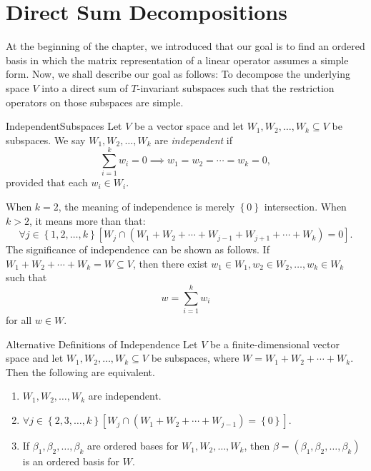 \documentclass[linearalgebraII]{subfiles}
\begin{document}
    \section{Direct Sum Decompositions}

    \begin{remark}
        At the beginning of the chapter, we introduced that our goal is to find an ordered basis in which the matrix representation of a linear operator assumes a simple form. Now, we shall describe our goal as follows: To decompose the underlying space $V$ into a direct sum of $T$-invariant subspaces such that the restriction operators on those subspaces are simple.
    \end{remark}
    
    \begin{definition}{Independent}{Subspaces}
        Let $V$ be a vector space and let $W_1, W_2, \ldots, W_k\subseteq V$ be subspaces. We say $W_1, W_2, \ldots, W_k$ are \emph{independent} if
        \begin{equation*}
            \sum^{k}_{i=1} w_i = 0\implies w_1=w_2=\cdots=w_k=0,
        \end{equation*}
        provided that each $w_i\in W_i$.
    \end{definition}

    \begin{remark}
        When $k=2$, the meaning of independence is merely $\left\lbrace 0 \right\rbrace$ intersection. When $k>2$, it means more than that:
        \begin{equation*}
            \forall j\in \left\lbrace 1, 2, \ldots, k \right\rbrace \left[ W_j\cap \left( W_1+W_2+\cdots+W_{j-1}+W_{j+1}+\cdots+W_k \right) = 0 \right].
        \end{equation*}
        The significance of independence can be shown as follows. If $W_1+W_2+\cdots+W_k=W\subseteq V$, then there exist $w_1\in W_1, w_2\in W_2,\ldots,w_k\in W_k$ such that
        \begin{equation*}
            w = \sum^{k}_{i=1} w_i
        \end{equation*}
        for all $w\in W$.
    \end{remark}

    \begin{prop}{Alternative Definitions of Independence}
        Let $V$ be a finite-dimensional vector space and let $W_1, W_2, \ldots, W_k\subseteq V$ be subspaces, where $W = W_1+W_2+\cdots+W_k$. Then the following are equivalent.
        \begin{enumerate}
            \item $W_1, W_2, \ldots, W_k$ are independent.
            \item $\forall j\in \left\lbrace 2, 3, \ldots, k \right\rbrace \left[ W_j\cap \left( W_1+W_2+\cdots+W_{j-1} \right) = \left\lbrace 0 \right\rbrace  \right]$.
            \item If $\beta_1, \beta_2, \ldots, \beta_k$ are ordered bases for $W_1, W_2, \ldots, W_k$, then $\beta = \left( \beta_1, \beta_2, \ldots, \beta_k \right)$ is an ordered basis for $W$.
        \end{enumerate}
    \end{prop}
\end{document}
